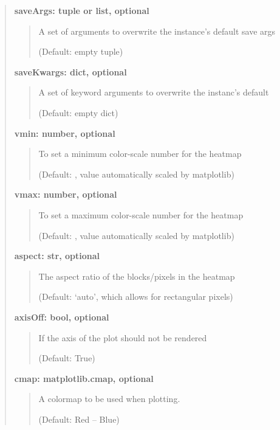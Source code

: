 \documentclass[letterpaper,10pt,english]{sphinxmanual}
\begin{document}
\begin{fulllineitems}
\begin{fulllineitems}
\begin{quote}
\begin{description}
\textbf{saveArgs: tuple or list, optional}
\begin{quote}

A set of arguments to overwrite the instance's default save args

(Default: empty tuple)
\end{quote}

\textbf{saveKwargs: dict, optional}
\begin{quote}

A set of keyword arguments to overwrite the instanc's default

(Default: empty dict)
\end{quote}

\textbf{vmin: number, optional}
\begin{quote}

To set a minimum color-scale number for the heatmap

(Default: , value automatically scaled by matplotlib)
\end{quote}

\textbf{vmax: number, optional}
\begin{quote}

To set a maximum color-scale number for the heatmap

(Default: , value automatically scaled by matplotlib)
\end{quote}

\textbf{aspect: str, optional}
\begin{quote}

The aspect ratio of the blocks/pixels in the heatmap

(Default: `auto', which allows for rectangular pixels)
\end{quote}

\textbf{axisOff: bool, optional}
\begin{quote}

If the axis of the plot should not be rendered

(Default: True)
\end{quote}

\textbf{cmap: matplotlib.cmap, optional}
\begin{quote}

A colormap to be used when plotting.

(Default: Red -- Blue)
\end{quote}

\end{description}\end{quote}

\end{fulllineitems}


\end{fulllineitems}
\end{document}
